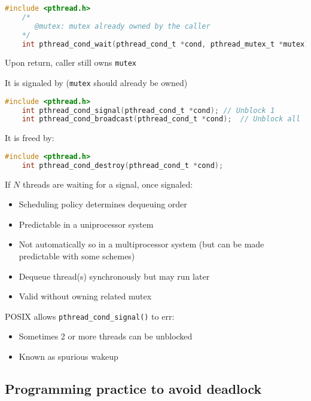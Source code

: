 \begin{lstlisting}[language=C]
    #include <pthread.h>
    /*
       @mutex: mutex already owned by the caller
    */
    int pthread_cond_wait(pthread_cond_t *cond, pthread_mutex_t *mutex); 
\end{lstlisting}
Upon return, caller still owns \texttt{mutex}

It is signaled by (\texttt{mutex} should already be owned)
\begin{lstlisting}[language=C]
    #include <pthread.h>
    int pthread_cond_signal(pthread_cond_t *cond); // Unblock 1
    int pthread_cond_broadcast(pthread_cond_t *cond);  // Unblock all
\end{lstlisting}

It is freed by:

\begin{lstlisting}[language=C]
    #include <pthread.h>
    int pthread_cond_destroy(pthread_cond_t *cond); 
\end{lstlisting}

If $N$ threads are waiting for a signal, once signaled:
\begin{itemize}
    \item Scheduling policy determines dequeuing order
    \item Predictable in a uniprocessor system
    \item Not automatically so in a multiprocessor system (but can be made predictable with some schemes)
    \item Dequeue thread(s) synchronously but may run later
    \item Valid without owning related mutex
\end{itemize}

POSIX allows \texttt{pthread\_cond\_signal()} to err:
\begin{itemize}
    \item Sometimes 2 or more threads can be unblocked
    \item Known as spurious wakeup
\end{itemize}

\subsection{Programming practice to avoid deadlock}

